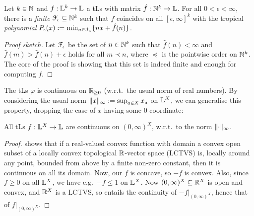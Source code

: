 \begin{theorem}\label{theorem:fepsilon}
 Let $k\in\mathbb{N}$ and $f:\mathbb{L}^k\to\mathbb{L}$ a tLs with matrix $\hat{f}:\mathbb{N}^k\to\mathbb{L}$.
 For all $0<\epsilon<\infty$, there is a \emph{finite} $\mathcal{F}_\epsilon \subseteq \mathbb{N}^k$ such that 
% 
$f$ coincides on all $[\epsilon,\infty]^k$ with the tropical \emph{polynomial} $P_\epsilon(x):=\min_{n\in \mathcal{F}_\epsilon}\{nx+\hat{f}(n)\}$.
\end{theorem}
\begin{proof}[Proof sketch]
Let $\mathcal{F}_\epsilon$ be the set of $n\in\mathbb{N}^{k}$ such that 
$\widehat f(n)<\infty$ and $\widehat f(m)> \widehat f(n)+\epsilon$ holds for all $m\prec n$, where $\preceq$ is the pointwise order on $\mathbb{N}^k$.
The core of the proof is showing that this set is indeed finite and enough for computing $f$.
\end{proof}

The tLs $\varphi$ is continuous on $\mathbb{R}_{\geq0}$ (w.r.t.\ the usual norm of real numbers).
By considering the usual norm $\lVert x\rVert_\infty:=\sup_{a\in X} x_a$ on $\mathbb{L}^X$, we can generalise this property, dropping the case of $x$ having some $0$ coordinate:

\begin{theorem}\label{thm:cont}
 All tLs $f:\mathbb{L}^X\to\mathbb{L}$ are continuous on $(0,\infty)^X$, w.r.t.\ to the norm $\lVert\cdot\rVert_\infty$.
\end{theorem}
\begin{proof}
\cite[Proposition 4.4.(3)]{Cobzas2017} shows that if a real-valued convex function with domain a convex open subset of a locally convex topological $\mathbb{R}$-vector space (LCTVS) is, locally around any point, bounded from above by a finite non-zero constant, then it is continuous on all its domain.
Now, our $f$ is concave, so $-f$ is convex.
Also, since $f\geq 0$ on all $\mathbb{L}^X$, we have e.g.\ $-f\leq 1$ on $\mathbb{L}^X$.
Now $(0,\infty)^X\subseteq \mathbb{R}^X$ is open and convex, and {\color{red}$\mathbb{R}^X$ is a LCTVS}, so \cite[Proposition 4.4.(3)]{Cobzas2017} entails the continuity of $-f\big|_{(0,\infty)^X}$, hence that of $f\big|_{(0,\infty)^X}$.
\end{proof}

